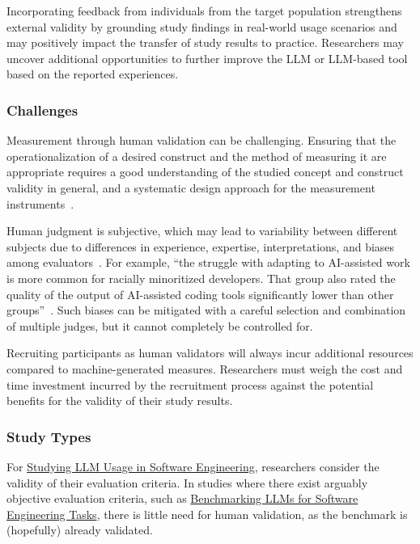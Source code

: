 Incorporating feedback from individuals from the target population strengthens external validity by grounding study findings in real-world usage scenarios and may positively impact the transfer of study results to practice.
Researchers may uncover additional opportunities to further improve the LLM or LLM-based tool based on the reported experiences.


\subsubsection{Challenges}

Measurement through human validation can be challenging.
Ensuring that the operationalization of a desired construct and the method of measuring it are appropriate requires a good understanding of the studied concept and construct validity in general, and a systematic design approach for the measurement instruments~\cite{DBLP:journals/tse/SjobergB23}.

Human judgment is subjective, which may lead to variability between different subjects due to differences in experience, expertise, interpretations, and biases among evaluators~\cite{DBLP:journals/pacmhci/McDonaldSF19}.
For example, \enquote{the struggle with adapting to AI-assisted work is more common for racially minoritized developers. That group also rated the quality of the output of AI-assisted coding tools significantly lower than other groups}~\cite{hicks_lee_foster-marks_2025}.
Such biases can be mitigated with a careful selection and combination of multiple judges, but it cannot completely be controlled for.

Recruiting participants as human validators will always incur additional resources compared to machine-generated measures.
Researchers must weigh the cost and time investment incurred by the recruitment process against the potential benefits for the validity of their study results.


\subsubsection{Study Types}

For \href{/study-types/#studying-llm-usage-in-software-engineering}{Studying LLM Usage in Software Engineering}, researchers \should consider the validity of their evaluation criteria.
In studies where there exist arguably objective evaluation criteria, such as \href{/study-types/#benchmarking-llms-for-software-engineering-tasks}{Benchmarking LLMs for Software Engineering Tasks}, there is little need for human validation, as the benchmark is (hopefully) already validated.

